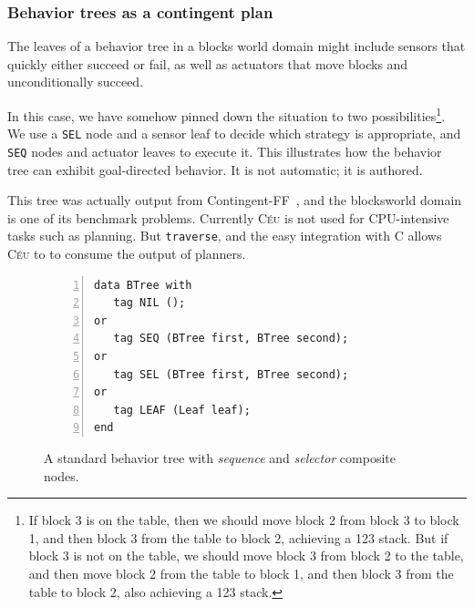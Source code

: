 \documentclass{sig-alternate}
\newcommand{\CEU}{\textsc{C\'{e}u}\xspace}
\newcommand{\code}[1] {{\small{\texttt{#1}}}}
\begin{document}
\subsubsection{Behavior trees as a contingent plan}

The leaves of a behavior tree in a blocks world domain
might include sensors that quickly either succeed or fail,
as well as actuators that move blocks and unconditionally succeed.

In this case, we have somehow pinned down the
situation to two possibilities\footnote{If block 3 is on the table,
then we should move block 2 from block 3 to block 1,
and then block 3 from the table to block 2,
achieving a 123 stack.
But if block 3 is not on the table,
we should move block 3 from block 2 to the table,
and then move block 2 from the table to block 1,
and then block 3 from the table to block 2,
also achieving a 123 stack.}.
We use a \code{SEL} node and a sensor leaf to decide which strategy is appropriate,
and \code{SEQ} nodes and actuator leaves to execute it.
This illustrates how the behavior tree can exhibit goal-directed behavior.
It is not automatic; it is authored.

This tree was actually output from Contingent-FF~\cite{hoffmann2005contingent},
and the blocksworld domain is one of its benchmark problems.
Currently \CEU is not used for CPU-intensive tasks such as planning.
But \code{traverse}, and the easy integration with C allows \CEU to
to consume the output of planners.

\begin{figure}%
\begin{lstlisting}[numbers=left,xleftmargin=3em]
data BTree with
   tag NIL ();
or
   tag SEQ (BTree first, BTree second);
or
   tag SEL (BTree first, BTree second);
or
   tag LEAF (Leaf leaf);
end

\end{lstlisting}
\caption{ A standard behavior tree with \emph{sequence} and \emph{selector}
          composite nodes.
\label{lst.bt1}
}
\end{figure}
\end{document}
